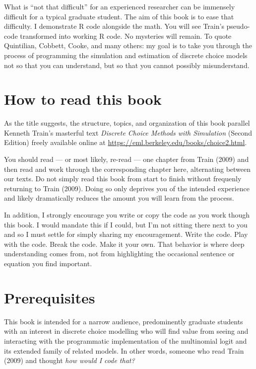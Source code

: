 \documentclass[
  letterpaper,
  DIV=11,
  numbers=noendperiod]{scrreprt}
\begin{document}
What is ``not that difficult'' for an experienced researcher can be
immensely difficult for a typical graduate student. The aim of this book
is to ease that difficulty. I demonstrate R code alongside the math. You
will see Train's pseudo-code transformed into working R code. No
mysteries will remain. To quote Quintilian, Cobbett, Cooke, and many
others: my goal is to take you through the process of programming the
simulation and estimation of discrete choice models not so that you can
understand, but so that you cannot possibly misunderstand.

\section*{How to read this book}\label{how-to-read-this-book}


As the title suggests, the structure, topics, and organization of this
book parallel Kenneth Train's masterful text \emph{Discrete Choice
Methods with Simulation} (Second Edition) freely available online at
\url{https://eml.berkeley.edu/books/choice2.html}.

You should read --- or most likely, re-read --- one chapter from Train
(2009) and then read and work through the corresponding chapter here,
alternating between our texts. Do not simply read this book from start
to finish without frequenly returning to Train (2009). Doing so only
deprives you of the intended experience and likely dramatically reduces
the amount you will learn from the process.

In addition, I strongly encourage you write or copy the code as you work
though this book. I would mandate this if I could, but I'm not sitting
there next to you and so I must settle for simply sharing my
encouragement. Write the code. Play with the code. Break the code. Make
it your own. That behavior is where deep understanding comes from, not
from highlighting the occasional sentence or equation you find
important.

\section*{Prerequisites}\label{prerequisites}


This book is intended for a narrow audience, predominently graduate
students with an interest in discrete choice modelling who will find
value from seeing and interacting with the programmatic implementation
of the multinomial logit and its extended family of related models. In
other words, someone who read Train (2009) and thought \emph{how would I
code that?}
\end{document}
